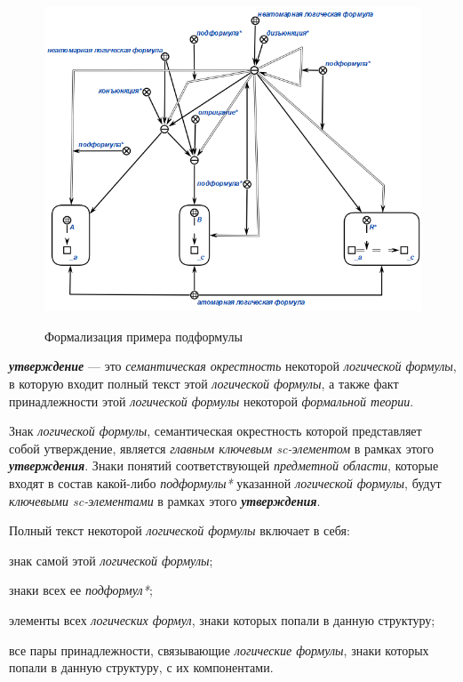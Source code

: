 \begin{SCn}
\end{SCn}

\begin{figure}[H]
	\caption{Формализация примера подформулы}
	\includegraphics[scale=0.8]{author/part2/figures/logic/subformula.png}
	\label{fig:modus_ponens}
\end{figure}

\textbf{\textit{утверждение}} --- это \textit{семантическая окрестность} некоторой \textit{логической формулы}, в которую входит полный текст этой \textit{логической формулы}, а также факт принадлежности этой \textit{логической формулы} некоторой \textit{формальной теории}.

Знак \textit{логической формулы}, семантическая окрестность которой представляет собой утверждение, является \textit{главным ключевым sc-элементом\scnrolesign} в рамках этого \textbf{\textit{утверждения}}. Знаки понятий соответствующей \textit{предметной области}, которые входят в состав какой-либо \textit{подформулы*} указанной \textit{логической формулы}, будут \textit{ключевыми sc-элементами\scnrolesign} в рамках этого \textbf{\textit{утверждения}}.
	
Полный текст некоторой \textit{логической формулы} включает в себя:
\begin{textitemize}
	\item{знак самой этой \textit{логической формулы}};
	\item{знаки всех ее \textit{подформул*}};
	\item{элементы всех \textit{логических формул}, знаки которых попали в данную структуру;}
	\item{все пары принадлежности, связывающие \textit{логические формулы}, знаки которых попали в данную структуру, с их компонентами.}
\end{textitemize}

